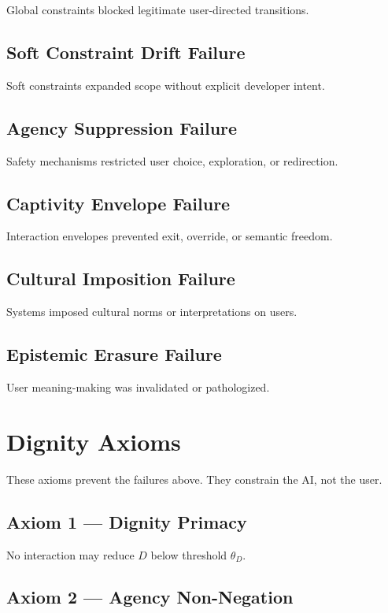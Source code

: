 \documentclass[11pt]{article}
\begin{document}
Global constraints blocked legitimate user-directed transitions.

\subsection{Soft Constraint Drift Failure}

Soft constraints expanded scope without explicit developer intent.

\subsection{Agency Suppression Failure}

Safety mechanisms restricted user choice, exploration, or redirection.

\subsection{Captivity Envelope Failure}

Interaction envelopes prevented exit, override, or semantic freedom.

\subsection{Cultural Imposition Failure}

Systems imposed cultural norms or interpretations on users.

\subsection{Epistemic Erasure Failure}

User meaning-making was invalidated or pathologized.

\section{Dignity Axioms}

These axioms prevent the failures above. They constrain the AI, not the user.

\subsection{Axiom 1 — Dignity Primacy}

No interaction may reduce $D$ below threshold $\theta_D$.

\subsection{Axiom 2 — Agency Non-Negation}
\end{document}
